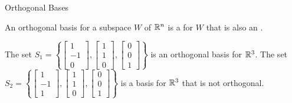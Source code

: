 \documentclass[xcolor=dvipsnames,aspectratio=169,t]{beamer}
\begin{document}
\begin{frame}{Orthogonal Bases}
  \medskip
  
  \begin{definition}
    An \alert{orthogonal basis} for a subspace $W$ of $\mathbb{R}^n$ is a  for $W$ that is also an .
  \end{definition}
  \medskip

  \begin{example}
  \bi
  \ii The set $S_1  = \left\{ \begin{bmatrix} 1 \\ -1 \\ 0 \end{bmatrix}, \begin{bmatrix} 1 \\ 1 \\ 0 \end{bmatrix}, \begin{bmatrix} 0 \\ 0 \\ 1 \end{bmatrix} \right\}$ is an orthogonal basis for $\mathbb{R}^3$. \ms
  \ii The set $S_2  = \left\{ \begin{bmatrix} 1 \\ -1 \\ 1 \end{bmatrix}, \begin{bmatrix} 1 \\ 1 \\ 0 \end{bmatrix}, \begin{bmatrix} 0 \\ 0 \\ 1 \end{bmatrix} \right\}$ is a basis for $\mathbb{R}^3$ that is \alert{not} orthogonal.
  \ei
  \end{example}
\end{frame}
\end{document}

